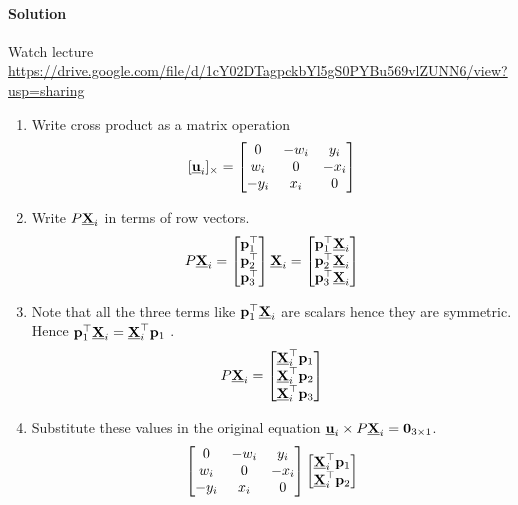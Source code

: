 \documentclass[times,singlecolumn]{article}
\newcommand{\ubfu}{\underline{\bfu}}
\begin{document}
\paragraph*{Solution}
Watch lecture \url{https://drive.google.com/file/d/1cY02DTagpckbYl5gS0PYBu569vlZUNN6/view?usp=sharing}
\begin{enumerate}
\item Write cross product as a matrix operation
  \[ [\ubfu_i]_{\times}= \begin{bmatrix}
      0 & -w_i & y_i \\
      w_i & 0 & -x_i \\
      -y_i & x_i & 0
    \end{bmatrix}\]
  \item Write $P \underline{\mathbf{X}}_i$ in terms of row vectors.
    \[ P \underline{\mathbf{X}}_i = \begin{bmatrix}
        \mathbf{p}_1^\top
        \\
        \mathbf{p}_2^\top
        \\
        \mathbf{p}_3^\top
      \end{bmatrix}\underline{\mathbf{X}}_i =  \begin{bmatrix}
        \mathbf{p}_1^\top\underline{\mathbf{X}}_i
        \\
        \mathbf{p}_2^\top\underline{\mathbf{X}}_i
        \\
        \mathbf{p}_3^\top\underline{\mathbf{X}}_i
      \end{bmatrix}\]
    \item Note that all the three terms like $\mathbf{p}_1^\top \underline{\mathbf{X}}_i$ are scalars
      hence they are symmetric. Hence $\mathbf{p}_1^\top \underline{\mathbf{X}}_i = \underline{\mathbf{X}}_i^\top \mathbf{p}_1$ .
      \[ P \underline{\mathbf{X}}_i = \begin{bmatrix}
          \underline{\mathbf{X}}_i^\top\mathbf{p}_1
                 \\
          \underline{\mathbf{X}}_i^\top \mathbf{p}_2
                 \\
          \underline{\mathbf{X}}_i^\top\mathbf{p}_3
        \end{bmatrix}\]
    \item Substitute these values in the original equation $\ubfu_i \times
      P\ubfX_i = \mathbf{0}_{3\times 1}$.
      \[
        \begin{bmatrix}
          0 & -w_i & y_i \\
          w_i & 0 & -x_i \\
          -y_i & x_i & 0
        \end{bmatrix}
        \begin{bmatrix}
          \underline{\mathbf{X}}_i^\top\mathbf{p}_1
          \\
          \underline{\mathbf{X}}_i^\top \mathbf{p}_2

\end{bmatrix}\]
\end{enumerate}
\end{document}
